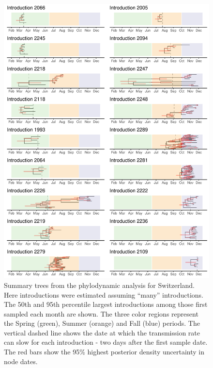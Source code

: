 \documentclass[9pt,twoside,lineno]{pnas-new}
\begin{document}
\begin{figure}[tbhp]
\centering
\includegraphics[width=0.75\linewidth]{figures/Re_skyline.max_chains.sampUB1.0.ctEst1.summary_trees.pdf}
\caption{Summary trees from the phylodynamic analysis for Switzerland. Here introductions were estimated assuming ``many'' introductions. The 50th and 95th percentile largest introductions among those first sampled each month are shown. The three color regions represent the Spring (green), Summer (orange) and Fall (blue) periods. The vertical dashed line shows the date at which the transmission rate can slow for each introduction - two days after the first sample date. The red bars show the 95\% highest posterior density uncertainty in node dates.}  
\label{fig:logged-chains-max}
\end{figure}
\newpage
\end{document}
